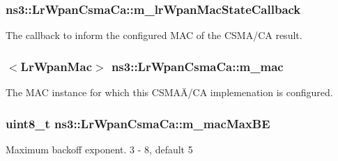 \subsubsection[{\texorpdfstring{m\+\_\+lr\+Wpan\+Mac\+State\+Callback}{m_lrWpanMacStateCallback}}]{ ns3\+::\+Lr\+Wpan\+Csma\+Ca\+::m\+\_\+lr\+Wpan\+Mac\+State\+Callback\hspace{0.3cm}{\ttfamily [private]}}\hypertarget{classns3_1_1LrWpanCsmaCa_a5204cf0e1f945663d73892148abcbfc0}{}\label{classns3_1_1LrWpanCsmaCa_a5204cf0e1f945663d73892148abcbfc0}
The callback to inform the configured M\+AC of the C\+S\+M\+A/\+CA result. 
\subsubsection[{\texorpdfstring{m\+\_\+mac}{m_mac}}]{$<${\bf Lr\+Wpan\+Mac}$>$ ns3\+::\+Lr\+Wpan\+Csma\+Ca\+::m\+\_\+mac\hspace{0.3cm}{\ttfamily [private]}}\hypertarget{classns3_1_1LrWpanCsmaCa_a15c5b0c3e10e4e3ad81293ee5916d1a6}{}\label{classns3_1_1LrWpanCsmaCa_a15c5b0c3e10e4e3ad81293ee5916d1a6}
The M\+AC instance for which this C\+S\+M\+AÄ/\+CA implemenation is configured. 
\subsubsection[{\texorpdfstring{m\+\_\+mac\+Max\+BE}{m_macMaxBE}}]{\setlength{\rightskip}{0pt plus 5cm}uint8\+\_\+t ns3\+::\+Lr\+Wpan\+Csma\+Ca\+::m\+\_\+mac\+Max\+BE\hspace{0.3cm}{\ttfamily [private]}}\hypertarget{classns3_1_1LrWpanCsmaCa_a8597381e64d77767d3100899122c8ddc}{}\label{classns3_1_1LrWpanCsmaCa_a8597381e64d77767d3100899122c8ddc}
Maximum backoff exponent. 3 -\/ 8, default 5 
